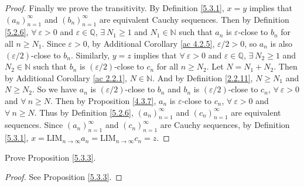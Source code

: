 \begin{proof}
Finally we prove the transitivity.
By Definition \ref{5.3.1}, \(x = y\) implies that \((a_n)_{n = 1}^{\infty}\) and \((b_n)_{n = 1}^{\infty}\) are equivalent Cauchy sequences.
Then by Definition \ref{5.2.6}, \(\forall\ \varepsilon > 0\) and \(\varepsilon \in \mathds{Q}\), \(\exists\ N_1 \geq 1\) and \(N_1 \in \mathds{N}\) such that \(a_n\) is \(\varepsilon\)-close to \(b_n\) for all \(n \geq N_1\).
Since \(\varepsilon > 0\), by Additional Corollary \ref{ac 4.2.5}, \(\varepsilon / 2 > 0\), so \(a_n\) is also \((\varepsilon / 2)\)-close to \(b_n\).
Similarly, \(y = z\) implies that \(\forall\ \varepsilon > 0\) and \(\varepsilon \in \mathds{Q}\), \(\exists\ N_2 \geq 1\) and \(N_2 \in \mathds{N}\) such that \(b_n\) is \((\varepsilon / 2)\)-close to \(c_n\) for all \(n \geq N_2\).
Let \(N = N_1 + N_2\).
Then by Additional Corollary \ref{ac 2.2.1}, \(N \in \mathds{N}\).
And by Definition \ref{2.2.11}, \(N \geq N_1\) and \(N \geq N_2\).
So we have \(a_n\) is \((\varepsilon / 2)\)-close to \(b_n\) and \(b_n\) is \((\varepsilon / 2)\)-close to \(c_n\), \(\forall\ \varepsilon > 0\) and \(\forall\ n \geq N\).
Then by Proposition \ref{4.3.7}, \(a_n\) is \(\varepsilon\)-close to \(c_n\), \(\forall\ \varepsilon > 0\) and \(\forall\ n \geq N\).
Thus by Definition \ref{5.2.6}, \((a_n)_{n = 1}^{\infty}\) and \((c_n)_{n = 1}^{\infty}\) are equivalent sequences.
Since \((a_n)_{n = 1}^{\infty}\) and \((c_n)_{n = 1}^{\infty}\) are Cauchy sequences, by Definition \ref{5.3.1}, \(x = \text{LIM}_{n \to \infty} a_n = \text{LIM}_{n \to \infty} c_n = z\).
\end{proof}

\exercisesection

\begin{exercise}\label{ex 5.3.1}
Prove Proposition \ref{5.3.3}.
\end{exercise}

\begin{proof}
See Proposition \ref{5.3.3}.
\end{proof}